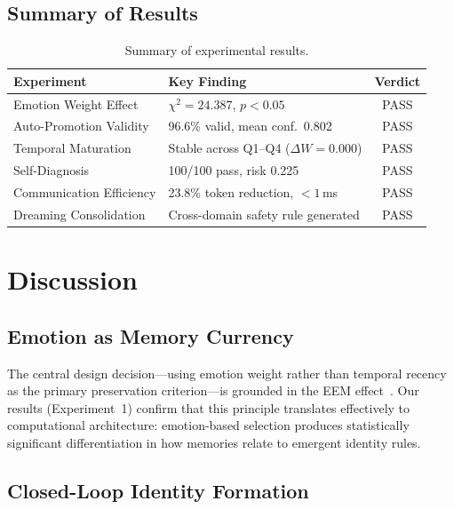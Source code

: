 \documentclass[11pt,a4paper]{article}
\begin{document}
\subsection{Summary of Results}

\begin{table}[h]
\centering
\caption{Summary of experimental results.}
\label{tab:summary}
\small
\begin{tabular}{@{}llc@{}}
\toprule
\textbf{Experiment} & \textbf{Key Finding} & \textbf{Verdict} \\
\midrule
Emotion Weight Effect & $\chi^2 = 24.387$, $p < 0.05$ & PASS \\
Auto-Promotion Validity & 96.6\% valid, mean conf.\ 0.802 & PASS \\
Temporal Maturation & Stable across Q1--Q4 ($\Delta W = 0.000$) & PASS \\
Self-Diagnosis & 100/100 pass, risk 0.225 & PASS \\
Communication Efficiency & 23.8\% token reduction, $< 1$\,ms & PASS \\
Dreaming Consolidation & Cross-domain safety rule generated & PASS \\
\bottomrule
\end{tabular}
\end{table}

\section{Discussion}

\subsection{Emotion as Memory Currency}

The central design decision---using emotion weight rather than temporal recency as the primary preservation criterion---is grounded in the EEM effect~\citep{labar2006cognitive}. Our results (Experiment~1) confirm that this principle translates effectively to computational architecture: emotion-based selection produces statistically significant differentiation in how memories relate to emergent identity rules.

\subsection{Closed-Loop Identity Formation}
\end{document}
